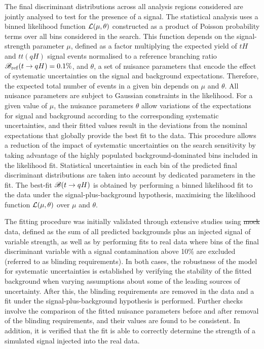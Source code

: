 \documentclass[PAPER, coverpage, atlasdraft=true, texlive=2016, UKenglish]{\ATLASLATEXPATH atlasdoc}
\providecommand{\DIFadd}[1]{{\protect\color{blue}\uwave{#1}}} %
\providecommand{\DIFdel}[1]{{\protect\color{red}\sout{#1}}}                      %
\providecommand{\DIFaddbegin}{} %
\providecommand{\DIFaddend}{} %
\providecommand{\DIFdelbegin}{} %
\providecommand{\DIFdelend}{} %
\begin{document}
The final \DIFaddbegin \DIFadd{BDT }\DIFaddend discriminant distributions across all analysis regions considered are jointly analysed to test for the 
presence of a signal. The statistical analysis uses a binned likelihood function ${\cal L}(\mu,\theta)$ constructed as
a product of Poisson probability terms over all bins considered in the search. This function depends
on the signal-strength parameter $\mu$, defined as a factor multiplying the expected yield of $tH$ and $tt(qH)$ signal events
normalised to a reference branching ratio $\mathscr{B}_{\mathrm{ref}}(t\to qH)=0.1\%$,
and $\theta$, a set of nuisance parameters that encode the effect of systematic uncertainties on the signal and background expectations. 
Therefore, the expected total number of events in a given bin depends on $\mu$ and $\theta$. 
All nuisance parameters are subject to Gaussian constraints in the likelihood.
For a given value of $\mu$, the nuisance parameters $\theta$ allow variations of the expectations for signal and background
according to the corresponding systematic uncertainties, and their fitted values result in the deviations from
the nominal expectations that globally provide the best fit to the data.
This procedure allows a reduction of the impact of systematic uncertainties on 
the search sensitivity by taking advantage of the highly populated background-dominated bins included in the likelihood fit.
Statistical uncertainties in each bin of the predicted final discriminant distributions are taken into account by dedicated parameters in the fit.     
The best-fit $\mathscr{B}(t\to qH)$ is obtained by performing a binned likelihood fit to the data under the signal-plus-background
hypothesis, maximising the likelihood function ${\cal L}(\mu,\theta)$ over $\mu$ and $\theta$.

The fitting procedure was initially validated through extensive studies using \DIFdelbegin \DIFdel{mock }\DIFdelend \DIFaddbegin \DIFadd{pseudo }\DIFaddend data, defined as the sum of all predicted backgrounds 
plus an injected signal of variable strength, as well as by performing fits to real data where bins of the final discriminant variable with 
a signal contamination above 10\% are excluded (referred to as blinding requirements).
In both cases, the robustness of the model for systematic uncertainties is established by verifying the stability of the fitted background 
when varying assumptions about some of the leading sources of uncertainty. 
After this, the blinding requirements
are removed in the data and a fit under the signal-plus-background hypothesis is performed. Further checks involve the comparison of the fitted 
nuisance parameters before and after removal of the blinding requirements, and their values are found to be consistent. In addition, it is verified that the 
fit is able to correctly determine the strength of a simulated signal injected into the real data.
\end{document}
